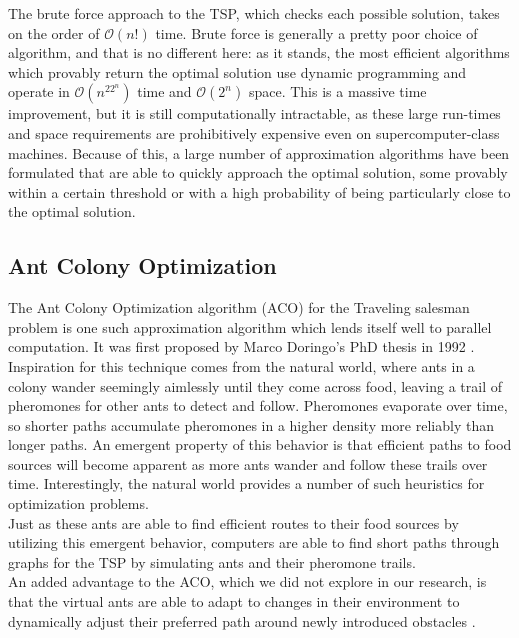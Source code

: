 \documentclass[twocolumn]{article}
\begin{document}
The brute force approach to the TSP, which checks each possible solution, takes 
on the order of $\mathcal{O}(n!)$ time. Brute force is generally a pretty poor choice of
algorithm, and that is no different here: as it stands, the most efficient 
algorithms which provably return the optimal solution use dynamic
programming and operate in $\mathcal{O}(n^22^n)$ time and $\mathcal{O}(2^n)$ space. 
This is a massive time improvement, but it is still computationally intractable, as 
these large run-times and space requirements are prohibitively expensive even on 
supercomputer-class machines. Because of this, a large number of approximation 
algorithms have been formulated that are able to quickly approach the optimal 
solution, some provably within a certain threshold or with a high probability of
being particularly close to the optimal solution. 

\subsection{Ant Colony Optimization} 

The Ant Colony Optimization algorithm (ACO) for the Traveling salesman problem 
is one such approximation algorithm which lends itself well to parallel 
computation. It was first proposed by Marco Doringo's PhD thesis in 1992 \cite{dorigo}. 
Inspiration for this technique comes from the natural world, where ants in a
colony wander seemingly aimlessly until they come across food, leaving
a trail of pheromones for other ants to detect and follow. Pheromones
evaporate over time, so shorter paths accumulate pheromones in a higher density 
more reliably than longer paths. An emergent property of this behavior is that 
efficient paths to food sources will become apparent as more ants wander and 
follow these trails over time. Interestingly, the natural world provides a number
of such heuristics for optimization problems. \\

Just as these ants are able to find efficient routes to their food sources by
utilizing this emergent behavior, computers are able to find short paths through
graphs for the TSP by simulating ants and their pheromone trails. \\

An added advantage to the ACO, which we did not explore in our research, is that
the virtual ants are able to adapt to changes in their environment to 
dynamically adjust their preferred path around newly introduced obstacles \cite{iridia:aco}.
\end{document}
